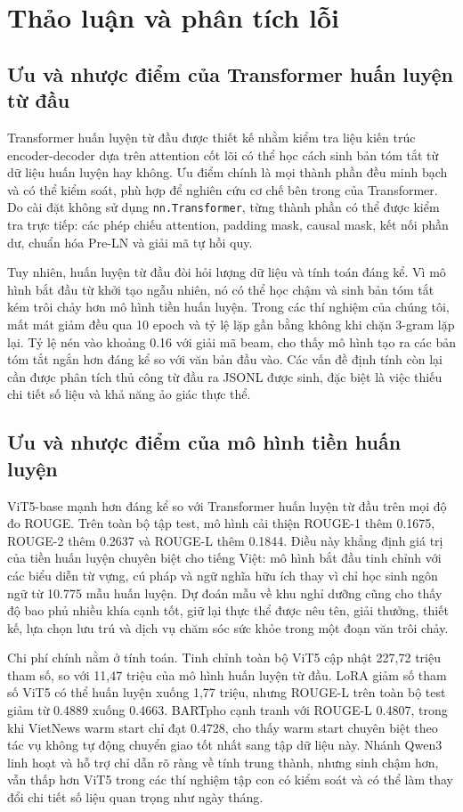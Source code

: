 \documentclass[conference]{IEEEtran}
\begin{document}
\section{Thảo luận và phân tích lỗi}

\subsection{Ưu và nhược điểm của Transformer huấn luyện từ đầu}
Transformer huấn luyện từ đầu được thiết kế nhằm kiểm tra liệu kiến trúc encoder-decoder dựa trên attention cốt lõi có thể học cách sinh bản tóm tắt từ dữ liệu huấn luyện hay không. Ưu điểm chính là mọi thành phần đều minh bạch và có thể kiểm soát, phù hợp để nghiên cứu cơ chế bên trong của Transformer. Do cài đặt không sử dụng \texttt{nn.Transformer}, từng thành phần có thể được kiểm tra trực tiếp: các phép chiếu attention, padding mask, causal mask, kết nối phần dư, chuẩn hóa Pre-LN và giải mã tự hồi quy.

Tuy nhiên, huấn luyện từ đầu đòi hỏi lượng dữ liệu và tính toán đáng kể. Vì mô hình bắt đầu từ khởi tạo ngẫu nhiên, nó có thể học chậm và sinh bản tóm tắt kém trôi chảy hơn mô hình tiền huấn luyện. Trong các thí nghiệm của chúng tôi, mất mát giảm đều qua 10 epoch và tỷ lệ lặp gần bằng không khi chặn 3-gram lặp lại. Tỷ lệ nén vào khoảng 0.16 với giải mã beam, cho thấy mô hình tạo ra các bản tóm tắt ngắn hơn đáng kể so với văn bản đầu vào. Các vấn đề định tính còn lại cần được phân tích thủ công từ đầu ra JSONL được sinh, đặc biệt là việc thiếu chi tiết số liệu và khả năng ảo giác thực thể.

\subsection{Ưu và nhược điểm của mô hình tiền huấn luyện}
ViT5-base mạnh hơn đáng kể so với Transformer huấn luyện từ đầu trên mọi độ đo ROUGE. Trên toàn bộ tập test, mô hình cải thiện ROUGE-1 thêm 0.1675, ROUGE-2 thêm 0.2637 và ROUGE-L thêm 0.1844. Điều này khẳng định giá trị của tiền huấn luyện chuyên biệt cho tiếng Việt: mô hình bắt đầu tinh chỉnh với các biểu diễn từ vựng, cú pháp và ngữ nghĩa hữu ích thay vì chỉ học sinh ngôn ngữ từ 10.775 mẫu huấn luyện. Dự đoán mẫu về khu nghỉ dưỡng cũng cho thấy độ bao phủ nhiều khía cạnh tốt, giữ lại thực thể được nêu tên, giải thưởng, thiết kế, lựa chọn lưu trú và dịch vụ chăm sóc sức khỏe trong một đoạn văn trôi chảy.

Chi phí chính nằm ở tính toán. Tinh chỉnh toàn bộ ViT5 cập nhật 227,72 triệu tham số, so với 11,47 triệu của mô hình huấn luyện từ đầu. LoRA giảm số tham số ViT5 có thể huấn luyện xuống 1,77 triệu, nhưng ROUGE-L trên toàn bộ test giảm từ 0.4889 xuống 0.4663. BARTpho cạnh tranh với ROUGE-L 0.4807, trong khi VietNews warm start chỉ đạt 0.4728, cho thấy warm start chuyên biệt theo tác vụ không tự động chuyển giao tốt nhất sang tập dữ liệu này. Nhánh Qwen3 linh hoạt và hỗ trợ chỉ dẫn rõ ràng về tính trung thành, nhưng sinh chậm hơn, vẫn thấp hơn ViT5 trong các thí nghiệm tập con có kiểm soát và có thể làm thay đổi chi tiết số liệu quan trọng như ngày tháng.
\end{document}
